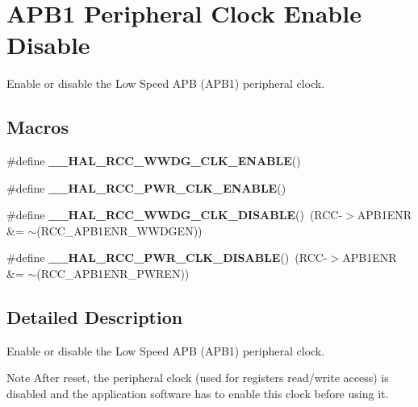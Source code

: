 \hypertarget{group___r_c_c___a_p_b1___clock___enable___disable}{}\section{A\+P\+B1 Peripheral Clock Enable Disable}
\label{group___r_c_c___a_p_b1___clock___enable___disable}


Enable or disable the Low Speed A\+PB (A\+P\+B1) peripheral clock.  


\subsection*{Macros}
\begin{DoxyCompactItemize}
\item 
\#define {\bfseries \+\_\+\+\_\+\+H\+A\+L\+\_\+\+R\+C\+C\+\_\+\+W\+W\+D\+G\+\_\+\+C\+L\+K\+\_\+\+E\+N\+A\+B\+LE}()
\item 
\#define {\bfseries \+\_\+\+\_\+\+H\+A\+L\+\_\+\+R\+C\+C\+\_\+\+P\+W\+R\+\_\+\+C\+L\+K\+\_\+\+E\+N\+A\+B\+LE}()
\item 
\mbox{\label{group___r_c_c___a_p_b1___clock___enable___disable_ga6afa0a633cf2553743a494d97aa5b997}} 
\#define {\bfseries \+\_\+\+\_\+\+H\+A\+L\+\_\+\+R\+C\+C\+\_\+\+W\+W\+D\+G\+\_\+\+C\+L\+K\+\_\+\+D\+I\+S\+A\+B\+LE}()~(R\+CC-\/$>$A\+P\+B1\+E\+NR \&= $\sim$(R\+C\+C\+\_\+\+A\+P\+B1\+E\+N\+R\+\_\+\+W\+W\+D\+G\+EN))
\item 
\mbox{\label{group___r_c_c___a_p_b1___clock___enable___disable_gaf3db86d2db2bad45732a742b6a91ea0b}} 
\#define {\bfseries \+\_\+\+\_\+\+H\+A\+L\+\_\+\+R\+C\+C\+\_\+\+P\+W\+R\+\_\+\+C\+L\+K\+\_\+\+D\+I\+S\+A\+B\+LE}()~(R\+CC-\/$>$A\+P\+B1\+E\+NR \&= $\sim$(R\+C\+C\+\_\+\+A\+P\+B1\+E\+N\+R\+\_\+\+P\+W\+R\+EN))
\end{DoxyCompactItemize}


\subsection{Detailed Description}
Enable or disable the Low Speed A\+PB (A\+P\+B1) peripheral clock. 

\begin{DoxyNote}{Note}
After reset, the peripheral clock (used for registers read/write access) is disabled and the application software has to enable this clock before using it. 
\end{DoxyNote}


